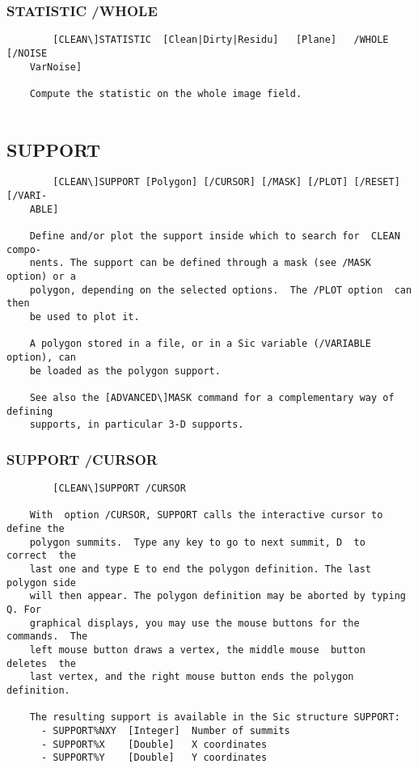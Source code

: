 \subsubsection{STATISTIC /WHOLE}
\begin{verbatim}
        [CLEAN\]STATISTIC  [Clean|Dirty|Residu]   [Plane]   /WHOLE   [/NOISE
    VarNoise]

    Compute the statistic on the whole image field.


\end{verbatim}
\subsection{SUPPORT}
\begin{verbatim}
        [CLEAN\]SUPPORT [Polygon] [/CURSOR] [/MASK] [/PLOT] [/RESET] [/VARI-
    ABLE]

    Define and/or plot the support inside which to search for  CLEAN  compo-
    nents. The support can be defined through a mask (see /MASK option) or a
    polygon, depending on the selected options.  The /PLOT option  can  then
    be used to plot it.

    A polygon stored in a file, or in a Sic variable (/VARIABLE option), can
    be loaded as the polygon support.

    See also the [ADVANCED\]MASK command for a complementary way of defining
    supports, in particular 3-D supports.

\end{verbatim}
\subsubsection{SUPPORT /CURSOR}
\begin{verbatim}
        [CLEAN\]SUPPORT /CURSOR

    With  option /CURSOR, SUPPORT calls the interactive cursor to define the
    polygon summits.  Type any key to go to next summit, D  to  correct  the
    last one and type E to end the polygon definition. The last polygon side
    will then appear. The polygon definition may be aborted by typing Q. For
    graphical displays, you may use the mouse buttons for the commands.  The
    left mouse button draws a vertex, the middle mouse  button  deletes  the
    last vertex, and the right mouse button ends the polygon definition.

    The resulting support is available in the Sic structure SUPPORT:
      - SUPPORT%NXY  [Integer]  Number of summits
      - SUPPORT%X    [Double]   X coordinates
      - SUPPORT%Y    [Double]   Y coordinates

\end{verbatim}
